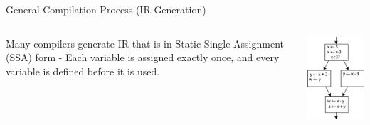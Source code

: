 \documentclass{beamer}
\begin{document}
\begin{frame}[fragile]{General Compilation Process (IR Generation)}
\begin{columns}[T,onlytextwidth]
        Many compilers generate IR that is in Static Single Assignment (SSA) form - Each variable is assigned exactly once, and every variable is defined before it is used.

        \vspace{1ex}
            \includegraphics[width=\linewidth]{images/ssa1.png}
        \endminipage\hfill

\end{columns}
\end{frame}
\end{document}
